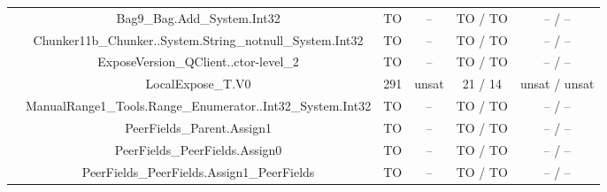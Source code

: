 \begin{table}[htbp]
\begin{minipage}{0.60\textwidth}
{\begin{tabular}[c]{c c!{\vrule width 1.5pt}c|c!{\vrule width 1.5pt}c|c|}
 			& Bag9\_Bag.Add\_System.Int32   	    	     	     & TO   & --      & TO  / TO       & --    / --        \\
 			& Chunker11b\_Chunker..System.String\_notnull\_System.Int32  & TO   & --      & TO  / TO       & --    / --        \\
 			& ExposeVersion\_QClient..ctor-level\_2   	    	     & TO   & --      & TO  / TO       & --    / --        \\
 			& LocalExpose\_T.V0   	    	     			     & 291  & unsat   & 21  / 14       & unsat / unsat     \\
 			& ManualRange1\_Tools.Range\_Enumerator..Int32\_System.Int32 & TO   & --      & TO  / TO       & --    / --        \\
 			& PeerFields\_Parent.Assign1   	    	      		     & TO   & --      & TO  / TO       & --    / --        \\
 			& PeerFields\_PeerFields.Assign0   	    	     	     & TO   & --      & TO  / TO       & --    / --        \\
 			& PeerFields\_PeerFields.Assign1\_PeerFields   	    	     & TO   & --      & TO  / TO       & --    / --        \\

\end{tabular}}
\end{minipage}
\end{table}
